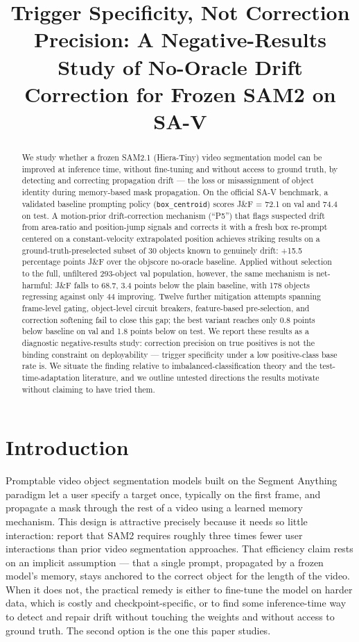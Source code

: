 \documentclass[11pt]{article}
\title{Trigger Specificity, Not Correction Precision: A Negative-Results Study of No-Oracle Drift Correction for Frozen SAM2 on SA-V}
\author{}
\date{}
\begin{document}
\maketitle

\begin{abstract}
We study whether a frozen SAM2.1 (Hiera-Tiny) video segmentation model can be improved at inference time, without fine-tuning and without access to ground truth, by detecting and correcting propagation drift — the loss or misassignment of object identity during memory-based mask propagation. On the official SA-V benchmark, a validated baseline prompting policy (\texttt{box\_centroid}) scores J\&F = 72.1 on val and 74.4 on test. A motion-prior drift-correction mechanism (``P5'') that flags suspected drift from area-ratio and position-jump signals and corrects it with a fresh box re-prompt centered on a constant-velocity extrapolated position achieves striking results on a ground-truth-preselected subset of 30 objects known to genuinely drift: +15.5 percentage points J\&F over the objscore no-oracle baseline. Applied without selection to the full, unfiltered 293-object val population, however, the same mechanism is net-harmful: J\&F falls to 68.7, 3.4 points below the plain baseline, with 178 objects regressing against only 44 improving. Twelve further mitigation attempts spanning frame-level gating, object-level circuit breakers, feature-based pre-selection, and correction softening fail to close this gap; the best variant reaches only 0.8 points below baseline on val and 1.8 points below on test. We report these results as a diagnostic negative-results study: correction precision on true positives is not the binding constraint on deployability — trigger specificity under a low positive-class base rate is. We situate the finding relative to imbalanced-classification theory and the test-time-adaptation literature, and we outline untested directions the results motivate without claiming to have tried them.
\end{abstract}

\section{Introduction}

Promptable video object segmentation models built on the Segment Anything paradigm \citep{kirillov2023,ravi2024} let a user specify a target once, typically on the first frame, and propagate a mask through the rest of a video using a learned memory mechanism. This design is attractive precisely because it needs so little interaction: \citet{ravi2024} report that SAM2 requires roughly three times fewer user interactions than prior video segmentation approaches. That efficiency claim rests on an implicit assumption — that a single prompt, propagated by a frozen model's memory, stays anchored to the correct object for the length of the video. When it does not, the practical remedy is either to fine-tune the model on harder data, which is costly and checkpoint-specific, or to find some inference-time way to detect and repair drift without touching the weights and without access to ground truth. The second option is the one this paper studies.
\end{document}
